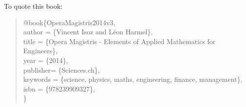 	To quote this book:
	\begin{quote}
	\noindent @book\{OperaMagistris2014v3, \\
		  author =       \{Vincent Isoz and Léon Harmel\}, \\
		  title =        \{Opera Magistris - Elements of Applied Mathematics for Engineers\}, \\
		  year =         \{2014\}, \\
	      publisher=     \{Sciences.ch\}, \\
		  keywords =     \{science, physics, maths, engineering, finance, management\}, \\
		  isbn =          \{978239909327\},\\
	\}
	\end{quote}